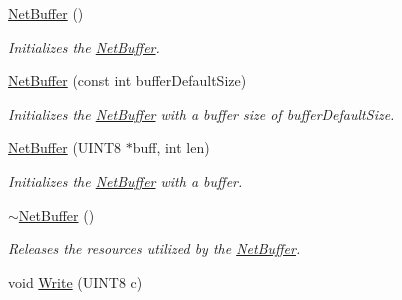 \begin{DoxyCompactItemize}
\item 
\hypertarget{class_rhesus_1_1_messenger_1_1_net_buffer_a5249b2bddb8de70ceb793f16584409bf}{\hyperlink{class_rhesus_1_1_messenger_1_1_net_buffer_a5249b2bddb8de70ceb793f16584409bf}{Net\-Buffer} ()}\label{class_rhesus_1_1_messenger_1_1_net_buffer_a5249b2bddb8de70ceb793f16584409bf}

\begin{DoxyCompactList}\small\item\em Initializes the \hyperlink{class_rhesus_1_1_messenger_1_1_net_buffer}{Net\-Buffer}. \end{DoxyCompactList}\item 
\hypertarget{class_rhesus_1_1_messenger_1_1_net_buffer_a230b5a4319c523589801f02b9a85fd13}{\hyperlink{class_rhesus_1_1_messenger_1_1_net_buffer_a230b5a4319c523589801f02b9a85fd13}{Net\-Buffer} (const int buffer\-Default\-Size)}\label{class_rhesus_1_1_messenger_1_1_net_buffer_a230b5a4319c523589801f02b9a85fd13}

\begin{DoxyCompactList}\small\item\em Initializes the \hyperlink{class_rhesus_1_1_messenger_1_1_net_buffer}{Net\-Buffer} with a buffer size of buffer\-Default\-Size. \end{DoxyCompactList}\item 
\hypertarget{class_rhesus_1_1_messenger_1_1_net_buffer_aa9ad4cec99599e38c277f6632dc62f53}{\hyperlink{class_rhesus_1_1_messenger_1_1_net_buffer_aa9ad4cec99599e38c277f6632dc62f53}{Net\-Buffer} (U\-I\-N\-T8 $\ast$buff, int len)}\label{class_rhesus_1_1_messenger_1_1_net_buffer_aa9ad4cec99599e38c277f6632dc62f53}

\begin{DoxyCompactList}\small\item\em Initializes the \hyperlink{class_rhesus_1_1_messenger_1_1_net_buffer}{Net\-Buffer} with a buffer. \end{DoxyCompactList}\item 
\hypertarget{class_rhesus_1_1_messenger_1_1_net_buffer_ad96acfc9ad9e5d2239b5b0f9594e2f8b}{\hyperlink{class_rhesus_1_1_messenger_1_1_net_buffer_ad96acfc9ad9e5d2239b5b0f9594e2f8b}{$\sim$\-Net\-Buffer} ()}\label{class_rhesus_1_1_messenger_1_1_net_buffer_ad96acfc9ad9e5d2239b5b0f9594e2f8b}

\begin{DoxyCompactList}\small\item\em Releases the resources utilized by the \hyperlink{class_rhesus_1_1_messenger_1_1_net_buffer}{Net\-Buffer}. \end{DoxyCompactList}\item 
\hypertarget{class_rhesus_1_1_messenger_1_1_net_buffer_a63e8fa8ae532047cca6563ae4a12ee6a}{void \hyperlink{class_rhesus_1_1_messenger_1_1_net_buffer_a63e8fa8ae532047cca6563ae4a12ee6a}{Write} (U\-I\-N\-T8 c)}\label{class_rhesus_1_1_messenger_1_1_net_buffer_a63e8fa8ae532047cca6563ae4a12ee6a}


\end{DoxyCompactItemize}
